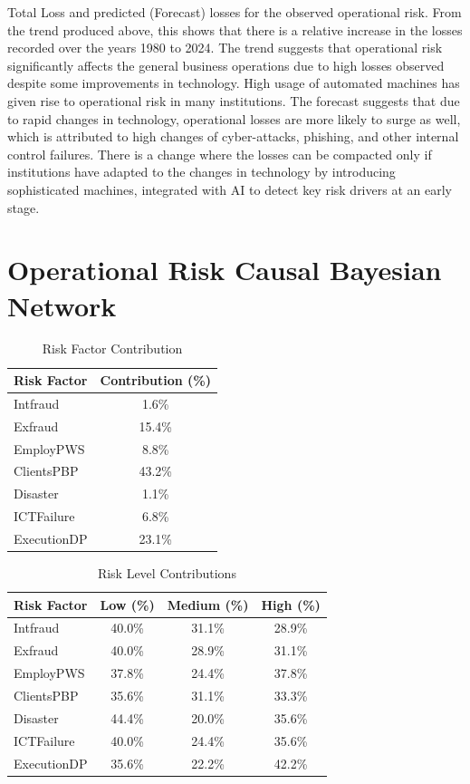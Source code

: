 Total Loss and predicted (Forecast) losses for the observed operational risk. From the trend produced above, this shows that there is a relative increase in the losses recorded over the years 1980 to 2024. The trend suggests that operational risk significantly affects the general business operations due to high losses observed despite some improvements in technology. High usage of automated machines has given rise to operational risk in many institutions. The forecast suggests that due to rapid changes in technology, operational losses are more likely to surge as well, which is attributed to high changes of cyber-attacks, phishing, and other internal control failures. There is a change where the losses can be compacted only if institutions have adapted to the changes in technology by introducing sophisticated machines, integrated with AI to detect key risk drivers at an early stage.

\section{Operational Risk Causal Bayesian Network}
\begin{table}[htbp]
  \centering
  \caption{Risk Factor Contribution}
  \begin{tabular}{lc}
    \hline
    \textbf{Risk Factor} & \textbf{Contribution (\%)} \\
    \hline
    Intfraud & 1.6\% \\
    Exfraud & 15.4\% \\
    EmployPWS & 8.8\% \\
    ClientsPBP & 43.2\% \\
    Disaster & 1.1\% \\
    ICTFailure & 6.8\% \\
    ExecutionDP & 23.1\% \\
    \hline
  \end{tabular}
\end{table}

\begin{table}[htbp]
  \centering
  \caption{Risk Level Contributions}
  \begin{tabular}{lccc}
    \hline
    \textbf{Risk Factor} & \textbf{Low (\%)} & \textbf{Medium (\%)} & \textbf{High (\%)} \\
    \hline
    Intfraud & 40.0\% & 31.1\% & 28.9\% \\
    Exfraud & 40.0\% & 28.9\% & 31.1\% \\
    EmployPWS & 37.8\% & 24.4\% & 37.8\% \\
    ClientsPBP & 35.6\% & 31.1\% & 33.3\% \\
    Disaster & 44.4\% & 20.0\% & 35.6\% \\
    ICTFailure & 40.0\% & 24.4\% & 35.6\% \\
    ExecutionDP & 35.6\% & 22.2\% & 42.2\% \\
    \hline
  \end{tabular}
\end{table}


